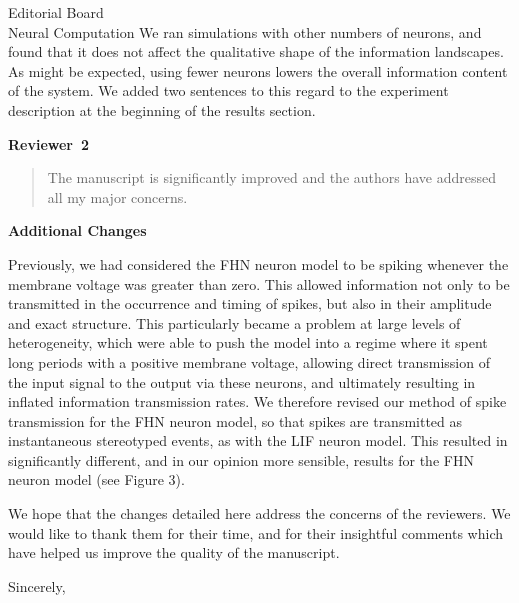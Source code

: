 \documentclass[]{letter}
\begin{document}
\begin{letter}{Editorial Board\\Neural Computation}
We ran simulations with other numbers of neurons, and found that it does not affect the qualitative shape of the information landscapes. As might be expected, using fewer neurons lowers the overall information content of the system. We added two sentences to this regard to the experiment description at the beginning of the results section.

{\large \bf Reviewer~2}
\begin{quotation}
  The manuscript is significantly improved and the authors have addressed all my major concerns.
\end{quotation}


{\large \bf Additional Changes}

Previously, we had considered the FHN neuron model to be spiking whenever the membrane voltage was greater than zero. This allowed information not only to be transmitted in the occurrence and timing of spikes, but also in their amplitude and exact structure. This particularly became a problem at large levels of heterogeneity, which were able to push the model into a regime where it spent long periods with a positive membrane voltage, allowing direct transmission of the input signal to the output via these neurons, and ultimately resulting in inflated information transmission rates. We therefore revised our method of spike transmission for the FHN neuron model, so that spikes are transmitted as instantaneous stereotyped events, as with the LIF neuron model. This resulted in significantly different, and in our opinion more sensible, results for the FHN neuron model (see Figure 3).

We hope that the changes detailed here address the concerns of the reviewers. We would like to thank them for their time, and for their insightful comments which have helped us improve the quality of the manuscript.

\closing{Sincerely,}

\end{letter}
\end{document}
